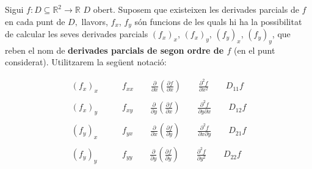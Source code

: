 \documentclass[12pt]{article}
\newcommand{\R}{\mathbb{R}}
\begin{document}
Sigui $f:D \subseteq \R^{2} \longrightarrow \R$ $D$ obert.
Suposem que existeixen les derivades parcials de $f$ en cada
punt de $D,$ llavors, $f_{x}$, $f_{y}$ s{\'o}n funcions de les quals hi ha la possibilitat de calcular les seves derivades parcials
$(f_{x})_{x}$, $(f_{x})_{y}$, $(f_{y})_{x}$, $(f_{y})_{y}$,
que reben el nom de \textbf{derivades parcials de
segon ordre de $f$} (en el punt considerat).
Utilitzarem la seg{\"u}ent notaci{\'o}:

\begin{equation*}
\begin{split}
(f_{x})_{x} & \qquad f_{xx} \qquad \frac{\partial}{\partial x} \left(
\frac{\partial f}{\partial x} \right) \qquad \frac{\partial^{2}
f}{\partial x^{2}} \qquad D_{11}f \\
&\\
(f_{x})_{y} &  \qquad f_{xy} \qquad \frac{\partial}{\partial y} \left( \frac{\partial
f}{\partial x} \right) \qquad \frac{\partial^{2} f}{\partial y \partial
x} \qquad D_{12} f \\
&\\
(f_{y})_{x} &  \qquad f_{yx} \qquad \frac{\partial}{\partial x} \left( \frac{\partial
f}{\partial y} \right) \qquad \frac{\partial^{2} f}{\partial x \partial
y} \qquad D_{21} f \\
&\\
(f_{y})_{y} &  \qquad f_{yy} \qquad \frac{\partial}{\partial y} \left( \frac{\partial
f}{\partial y} \right) \qquad \frac{\partial^{2} f}{\partial
y^{2}} \qquad D_{22}f
\end{split}
\end{equation*}
\end{document}
